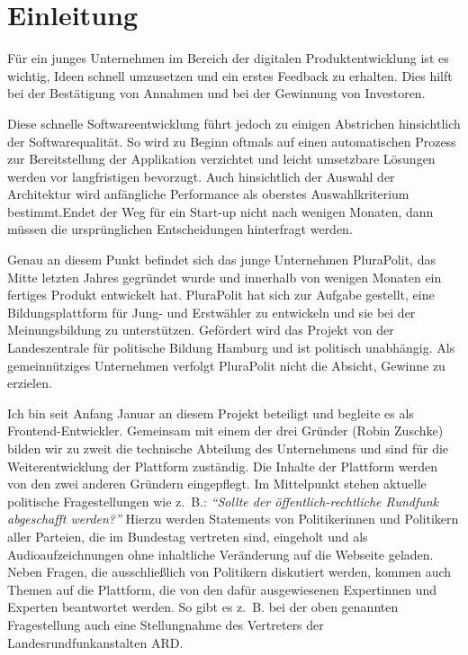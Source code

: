\section{Einleitung}

Für ein junges Unternehmen im Bereich der digitalen Produktentwicklung ist es wichtig, Ideen schnell umzusetzen und ein erstes Feedback zu erhalten. Dies hilft bei der Bestätigung von Annahmen und bei der Gewinnung von Investoren.

Diese schnelle Softwareentwicklung führt jedoch zu einigen Abstrichen hinsichtlich der Softwarequalität. So wird zu Beginn oftmals auf einen automatischen Prozess zur Bereitstellung der Applikation verzichtet und leicht umsetzbare Lösungen werden vor langfristigen bevorzugt. Auch hinsichtlich der Auswahl der Architektur wird anfängliche Performance als oberstes Auswahlkriterium bestimmt.\footnotemark Endet der Weg für ein Start-up nicht nach wenigen Monaten, dann müssen die ursprünglichen Entscheidungen hinterfragt werden.


Genau an diesem Punkt befindet sich das junge Unternehmen PluraPolit, das Mitte letzten Jahres gegründet wurde und innerhalb von wenigen Monaten ein fertiges Produkt entwickelt hat. PluraPolit hat sich zur Aufgabe gestellt, eine Bildungsplattform für Jung- und Erstwähler zu entwickeln und sie bei der Meinungsbildung zu unterstützen. Gefördert wird das Projekt von der Landeszentrale für politische Bildung Hamburg und ist politisch unabhängig. Als gemeinnütziges Unternehmen verfolgt PluraPolit nicht die Absicht, Gewinne zu erzielen.

Ich bin seit Anfang Januar an diesem Projekt beteiligt und begleite es als Frontend-Entwickler. Gemeinsam mit einem der drei Gründer (Robin Zuschke) bilden wir zu zweit die technische Abteilung des Unternehmens und sind für die Weiterentwicklung der Plattform zuständig. Die Inhalte der Plattform werden von den zwei anderen Gründern eingepflegt. Im Mittelpunkt stehen aktuelle politische Fragestellungen wie z.~B.: \textit{\enquote{Sollte der öffentlich-rechtliche Rundfunk abgeschafft werden?}} Hierzu werden Statements von Politikerinnen und Politikern aller Parteien, die im Bundestag vertreten sind, eingeholt und als Audioaufzeichnungen ohne inhaltliche Veränderung auf die Webseite geladen. Neben Fragen, die ausschließlich von Politikern diskutiert werden, kommen auch Themen auf die Plattform, die von den dafür ausgewiesenen Expertinnen und Experten beantwortet werden. So gibt es z.~B. bei der oben genannten Fragestellung auch eine Stellungnahme des Vertreters der Landesrundfunkanstalten ARD. 

